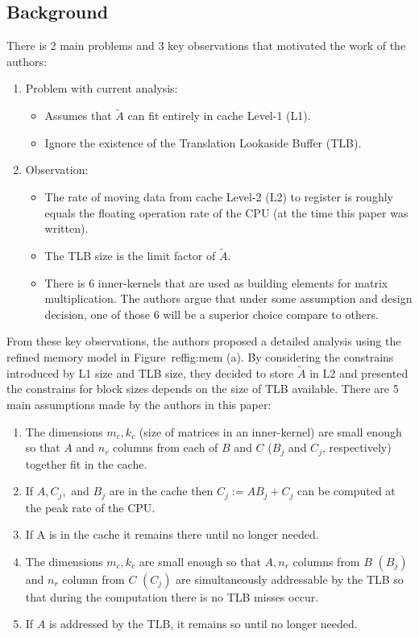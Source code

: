 \documentclass[a4paper,12pt]{article}
\begin{document}
\subsection{Background}
There is 2 main problems and 3 key observations that motivated the work of the authors:
\begin{enumerate}
    \setlength{\parskip}{0cm}
    \setlength{\itemsep}{0cm}
    \item Problem with current analysis:
        \begin{itemize}
            \setlength{\parskip}{0cm}
            \setlength{\itemsep}{0cm}
            \item Assumes that $\tilde{A}$ can fit entirely in cache Level-1 (L1).
            \item Ignore the existence of the Translation Lookaside Buffer (TLB).
        \end{itemize}
    \item Observation:
        \begin{itemize}
            \setlength{\parskip}{0cm}
            \setlength{\itemsep}{0cm}
            \item The rate of moving data from cache Level-2 (L2) to register is roughly equals the floating operation rate of the CPU (at the time this paper was written).
            \item The TLB size is the limit factor of $\tilde{A}$.
            \item There is 6 inner-kernels that are used as building elements for matrix multiplication. The authors argue that under some assumption and design decision, one of those 6 will be a superior choice compare to others.
        \end{itemize}
\end{enumerate}

From these key observations, the authors proposed a detailed analysis using the refined memory model in Figure~ref{fig:mem} (a). By considering the constrains introduced by L1 size and TLB size, they decided to store $\tilde{A}$ in L2 and presented the constrains for block sizes depends on the size of TLB available. There are 5 main assumptions made by the authors in this paper:
\begin{enumerate}
    \setlength{\parskip}{0cm}
    \setlength{\itemsep}{0cm}
    \item The dimensions $m_c, k_c$ (size of matrices in an inner-kernel) are small enough so that $A$ and $n_r$ columns from each of $B$ and $C$ ($B_j$ and $C_j$, respectively) together fit in the cache.
    \item If $A, C_j,$ and $B_j$ are in the cache then $C_j := AB_j + C_j$ can be computed at the peak rate of the CPU.
    \item If A is in the cache it remains there until no longer needed.
    \item The dimensions $m_c, k_c$ are small enough so that $A, n_r$ columns from $B$ $(B_j)$ and $n_r$ column from $C$ $(C_j)$ are simultaneously addressable by the TLB so that during the computation there is no TLB misses occur.
    \item If $A$ is addressed by the TLB, it remains so until no longer needed.
\end{enumerate}
\end{document}
